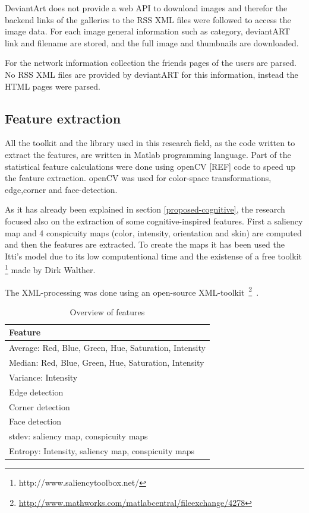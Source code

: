 DeviantArt does not provide a web API to download images and therefor the backend links of the galleries to the RSS XML files were followed to access
the image data. For each image general information such as category, deviantART link and filename are stored, and the full image and 
thumbnails are downloaded.

For the network information collection the friends pages 
of the users are parsed. No RSS XML files are provided by deviantART for this
information, instead the HTML pages were parsed.


\subsection{Feature extraction}
All the toolkit and the library used in this research field, as the code written to extract the features, are written in Matlab programming language.
Part of the statistical feature calculations were done using openCV [REF] code to speed up the feature extraction. openCV was used for color-space transformations, edge,corner and face-detection.

As it has already been explained in section \ref{proposed-cognitive}, the research focused also on the extraction of some cognitive-inspired features. First a saliency map and 4 conspicuity maps (color, intensity, orientation and skin) are computed and then the features are extracted. To create the maps it has been used the Itti's model \cite{Itti_model} due to its low computentional time and the existense of a free toolkit \footnote{http://www.saliencytoolbox.net/} made by Dirk Walther. 

The XML-processing was done using an open-source XML-toolkit~\footnote{\url{http://www.mathworks.com/matlabcentral/fileexchange/4278}}~\cite{geusebroek2005six}.

\begin{table}[htb]
    \centering
    \begin{tabular}	{ | l | } 
		\hline
		Feature \\
		\hline
		Average: Red, Blue, Green, Hue, Saturation, Intensity \\
		Median: Red, Blue, Green, Hue, Saturation, Intensity \\
		Variance: Intensity \\
		Edge detection \\
		Corner detection \\
		Face detection \\
		stdev: saliency map, conspicuity maps \\
		Entropy: Intensity, saliency map, conspicuity maps \\
		\hline
    \end{tabular}
    \caption{Overview of features}
    \label{tab:featurelist}
\end{table}

